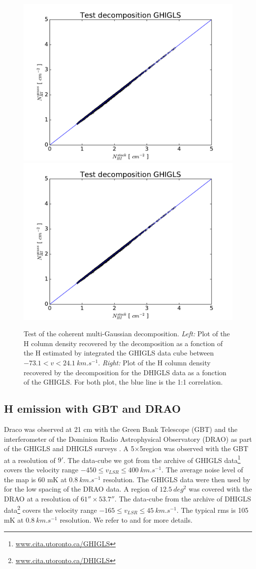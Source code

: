 \documentclass[traditabstract]{aa}
\begin{document}
\begin{figure}
  \includegraphics[page=1,width=0.49\linewidth]{Figures/Test_decomposition.pdf}
  \includegraphics[page=3,width=0.49\linewidth]{Figures/Test_decomposition.pdf}
  \caption{\label{Test} Test of the coherent multi-Gaussian decomposition. \emph{Left:} Plot of the H column density recovered by the decomposition as a fonction of the H estimated by integrated the GHIGLS data cube between $-73.1<v<24.1\: km.s^{-1}$. \emph{Right:} Plot of the H column density recovered by the decomposition for the DHIGLS data as a fonction of the GHIGLS. For both plot, the blue line is the 1:1 correlation.}
\end{figure}


   \subsection{H emission with GBT and DRAO}

   Draco was observed at 21 cm with the Green Bank Telescope (GBT) and the interferometer of the Dominion Radio Astrophysical Observatory (DRAO) as part of the GHIGLS and DHIGLS surveys \citep{Martin_2015,Blagrave_2017}.
A 5\degree$\times $5\degree region was observed with the GBT at a resolution of $9'$. The data-cube we got from the archive of GHIGLS data\footnote{\url{www.cita.utoronto.ca/GHIGLS}} covers the velocity range $-450\leq v_{LSR}\leq 400\: km.s^{-1}$. The average noise level of the map is 60 mK at $0.8\: km.s^{-1}$ resolution.
The GHIGLS data were then used by \cite{Blagrave_2017} for the low spacing of the DRAO data. A region of $12.5\: deg^2$ was covered with the DRAO at a resolution of $61''\times 53.7''$. The data-cube from the archive of DHIGLS data\footnote{\url{www.cita.utoronto.ca/DHIGLS}} covers the velocity range $-165\leq v_{LSR}\leq 45\: km.s^{-1}$. The typical rms is 105 mK at $0.8\: km.s^{-1}$ resolution.
We refer to \cite{Martin_2015} and \cite{Blagrave_2017} for more details.
\end{document}
